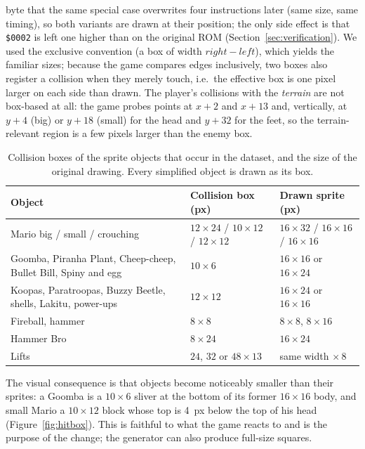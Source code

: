 \documentclass{article}
\newcommand{\hex}[1]{\texttt{\$#1}}
\begin{document}
byte that the same special case overwrites four instructions later (same size, same timing), so
both variants are drawn at their position; the only side effect is that \hex{0002} is left one
higher than on the original ROM (Section~\ref{sec:verification}). We used the exclusive convention (a box of width
$\mathit{right}-\mathit{left}$), which yields the familiar sizes; because the game compares edges
inclusively, two boxes also register a collision when they merely touch, i.e.\ the effective box
is one pixel larger on each side than drawn. The player's collisions with the \emph{terrain} are
not box-based at all: the game probes points at $x+2$ and $x+13$ and, vertically, at $y+4$ (big)
or $y+18$ (small) for the head and $y+32$ for the feet, so the terrain-relevant region is a few
pixels larger than the enemy box.

\begin{table}[t]
  \caption{Collision boxes of the sprite objects that occur in the dataset, and the size of the
  original drawing. Every simplified object is drawn as its box.}
  \centering
  \small
  \begin{tabular}{lll}
    \toprule
    Object & Collision box (px) & Drawn sprite (px) \\
    \midrule
    Mario big / small / crouching & $12\times24$ / $10\times12$ / $12\times12$ & $16\times32$ / $16\times16$ / $16\times16$ \\
    Goomba, Piranha Plant, Cheep-cheep, Bullet Bill, Spiny and egg & $10\times6$ & $16\times16$ or $16\times24$ \\
    Koopas, Paratroopas, Buzzy Beetle, shells, Lakitu, power-ups & $12\times12$ & $16\times24$ or $16\times16$ \\
    Fireball, hammer & $8\times8$ & $8\times8$, $8\times16$ \\
    Hammer Bro & $8\times24$ & $16\times24$ \\
    Lifts & $24$, $32$ or $48\times13$ & same width $\times\,8$ \\
    \bottomrule
  \end{tabular}
  \label{tab:boxes}
\end{table}

The visual consequence is that objects become noticeably smaller than their sprites: a Goomba is
a $10\times6$ sliver at the bottom of its former $16\times16$ body, and small Mario a
$10\times12$ block whose top is 4~px below the top of his head (Figure~\ref{fig:hitbox}). This is
faithful to what the game reacts to and is the purpose of the change; the generator can also
produce full-size squares.
\end{document}

